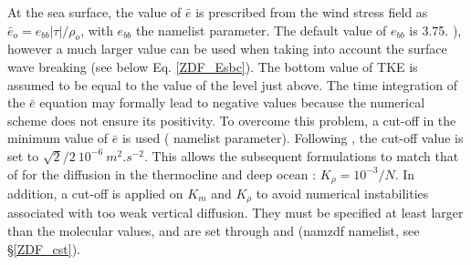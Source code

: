 At the sea surface, the value of $\bar{e}$ is prescribed from the wind 
stress field as $\bar{e}_o = e_{bb} |\tau| / \rho_o$, with $e_{bb}$ the  
namelist parameter. The default value of $e_{bb}$ is 3.75. \citep{Gaspar1990}), 
however a much larger value can be used when taking into account the 
surface wave breaking (see below Eq. \eqref{ZDF_Esbc}). 
The bottom value of TKE is assumed to be equal to the value of the level just above. 
The time integration of the $\bar{e}$ equation may formally lead to negative values 
because the numerical scheme does not ensure its positivity. To overcome this 
problem, a cut-off in the minimum value of $\bar{e}$ is used ( 
namelist parameter). Following \citet{Gaspar1990}, the cut-off value is set 
to $\sqrt{2}/2~10^{-6}~m^2.s^{-2}$. This allows the subsequent formulations 
to match that of \citet{Gargett1984} for the diffusion in the thermocline and 
deep ocean :  $K_\rho = 10^{-3} / N$. 
In addition, a cut-off is applied on $K_m$ and $K_\rho$ to avoid numerical 
instabilities associated with too weak vertical diffusion. They must be 
specified at least larger than the molecular values, and are set through 
 and  (namzdf namelist, see \S\ref{ZDF_cst}).

